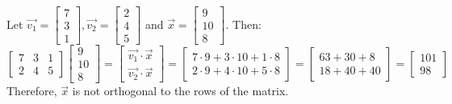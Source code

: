 \begin{eg}
    Let $\vec{v_1} = \begin{bmatrix}
        7 \\ 3 \\ 1
    \end{bmatrix}, \vec{v_2} = \begin{bmatrix}
        2 \\ 4 \\ 5
    \end{bmatrix}$ and $\vec{x} = \begin{bmatrix}
        9 \\ 10 \\ 8
    \end{bmatrix}$. Then:
    \[
        \begin{bmatrix}
            7 & 3 & 1 \\
            2 & 4 & 5
        \end{bmatrix} \begin{bmatrix}
            9 \\ 10 \\ 8
        \end{bmatrix} = \begin{bmatrix}
            \vec{v_1} \cdot \vec{x} \\
            \vec{v_2} \cdot \vec{x}
        \end{bmatrix} = \begin{bmatrix}
            7 \cdot 9 + 3 \cdot 10 + 1 \cdot 8 \\
            2 \cdot 9 + 4 \cdot 10 + 5 \cdot 8
        \end{bmatrix} = \begin{bmatrix}
            63 + 30 + 8 \\
            18 + 40 + 40
        \end{bmatrix} = \begin{bmatrix}
            101 \\ 98
        \end{bmatrix}
    \]
    Therefore, $\vec{x}$ is not orthogonal to the rows of the matrix.
\end{eg}

